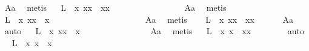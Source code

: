 \begin{isabellebody}
\ A{}a\ \isamarkupfalse%
\ metis\isanewline
\ \isamarkupfalse%
\ L{}{\isacharcolon}\ \ {\isachardoublequoteopen}{\isasymforall}x{\isachardot}\ {\isacharparenleft}{\isasymbox}{\isasymbox}x{\isacharparenright}{\isasymcdot}x\ {\isasymapprox}\ {\isacharparenleft}{\isasymbox}x{\isacharparenright}{\isasymcdot}x{\isachardoublequoteclose}\ \ \ \ \ \ \ \ \ \ \ \ \ \ \ \ \isamarkupfalse%
\ A{}a\ \isamarkupfalse%
\ metis\isanewline
\ \isamarkupfalse%
\ L{}{\isacharcolon}\ \ {\isachardoublequoteopen}{\isasymforall}x{\isachardot}\ {\isacharparenleft}{\isasymbox}{\isasymbox}x{\isacharparenright}{\isasymcdot}x\ {\isasymapprox}\ x{\isachardoublequoteclose}\ \ \ \ \ \ \ \ \ \ \ \ \ \ \ \ \ \ \ \ \ \isamarkupfalse%
\ A{}a\ \isamarkupfalse%
\ metis\isanewline
\ \isamarkupfalse%
\ \ L{}{\isacharcolon}\ \ {\isachardoublequoteopen}{\isasymforall}x{\isachardot}\ {\isasymbox}{\isacharparenleft}{\isacharparenleft}{\isasymbox}{\isasymbox}x{\isacharparenright}{\isasymcdot}x{\isacharparenright}\ {\isasymapprox}\ {\isasymbox}{\isacharparenleft}{\isacharparenleft}{\isasymbox}{\isasymbox}x{\isacharparenright}{\isasymcdot}{\isacharparenleft}{\isasymbox}x{\isacharparenright}{\isacharparenright}{\isachardoublequoteclose}\ \ \ \ \ \isamarkupfalse%
\ A{}a\ \isamarkupfalse%
\ auto\isanewline
\ \isamarkupfalse%
\ L{}{\isacharcolon}\ \ {\isachardoublequoteopen}{\isasymforall}x\ {\isachardot}{\isasymbox}{\isacharparenleft}{\isacharparenleft}{\isasymbox}{\isasymbox}x{\isacharparenright}{\isasymcdot}x{\isacharparenright}\ {\isasymapprox}\ {\isasymbox}{\isasymbox}x{\isachardoublequoteclose}\ \ \ \ \ \ \ \ \ \ \ \ \ \ \ \isamarkupfalse%
\ A{}a\ \isamarkupfalse%
\ metis\isanewline
\ \isamarkupfalse%
\ L{}{\isacharcolon}\ \ {\isachardoublequoteopen}{\isasymforall}x{\isachardot}\ {\isasymbox}{\isasymbox}{\isacharparenleft}x{\isasymbox}{\isacharparenright}\ {\isasymapprox}\ {\isasymbox}{\isacharparenleft}{\isasymbox}{\isasymbox}{\isacharparenleft}x{\isasymbox}{\isacharparenright}{\isacharparenright}{\isasymcdot}{\isacharparenleft}x{\isasymbox}{\isacharparenright}{\isachardoublequoteclose}\ \ \ \ \ \ \ \isamarkupfalse%
\ auto\isanewline
\ \isamarkupfalse%
\ L{}{\isacharcolon}\ \ {\isachardoublequoteopen}{\isasymforall}x{\isachardot}\ {\isasymbox}{\isasymbox}{\isacharparenleft}x{\isasymbox}{\isacharparenright}\ {\isasymapprox}\ {\isasymbox}{\isacharparenleft}x{\isasymbox}{\isacharparenright}{\isachardoublequoteclose}\ \ \ \ \ \ \ \ \ \ \ \ \ \ \ \ \ \isamarkupfalse%

\end{isabellebody}
